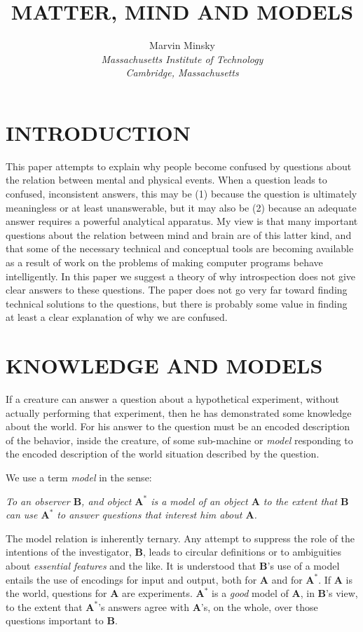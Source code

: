 \documentclass{article}
\title{\vspace{10ex}MATTER, MIND AND MODELS}
\author{Marvin Minsky\\
		\textit{Massachusetts Institute of Technology}\\
		\textit{Cambridge, Massachusetts}}
\date{}
\begin{document}
\maketitle

\section*{INTRODUCTION}

This paper attempts to explain why people become confused by questions about the relation between mental and physical events. When a question leads to confused, inconsistent answers, this may be (1) because the question is ultimately meaningless or at least unanswerable, but it may also be (2) because an adequate answer requires a powerful analytical apparatus. My view is that many important questions about the relation between mind and brain are of this latter kind, and that some of the necessary technical and conceptual tools are becoming available as a result of work on the problems of making computer programs behave intelligently. In this paper we suggest a theory of why introspection does not give clear answers to these questions. The paper does not go very far toward finding technical solutions to the questions, but there is probably some value in finding at least a clear explanation of why we are confused.

\section*{KNOWLEDGE AND MODELS}

If a creature can answer a question about a hypothetical experiment, without actually performing that experiment, then he has demonstrated some knowledge about the world. For his answer to the question must be an encoded description of the behavior, inside the creature, of some sub-machine or \textit{model} responding to the encoded description of the world situation described by the question.

We use a term \textit{model} in the sense:

\begin{displayquote}
\textit{To an observer $\mathbf{B}$, and object $\mathbf{A^\ast}$ is a model of an object $\mathbf{A}$ to the extent that $\mathbf{B}$ can use $\mathbf{A^\ast}$ to answer questions that interest him about $\mathbf{A}$.}
\end{displayquote}

The model relation is inherently ternary. Any attempt to suppress the role of the intentions of the investigator, $\mathbf{B}$, leads to circular definitions or to ambiguities about \textit{essential features} and the like. It is understood that $\mathbf{B}$'s use of a model entails the use of encodings for input and output, both for $\mathbf{A}$ and for $\mathbf{A^\ast}$. If $\mathbf{A}$ is the world, questions for $\mathbf{A}$ are experiments. $\mathbf{A^\ast}$ is a \textit{good} model of $\mathbf{A}$, in $\mathbf{B}$'s view, to the extent that $\mathbf{A^\ast}$'s answers agree with $\mathbf{A}$'s, on the whole, over those questions important to $\mathbf{B}$.
\end{document}

